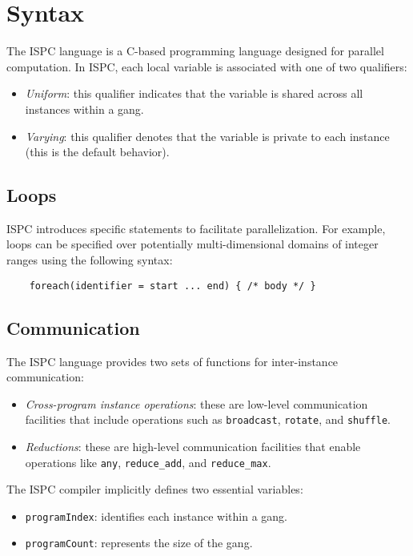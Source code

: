 \section{Syntax}

The ISPC  language is a C-based programming language designed for parallel computation. 
In ISPC, each local variable is associated with one of two qualifiers:
\begin{itemize}
    \item \textit{Uniform}: this qualifier indicates that the variable is shared across all instances within a gang.
    \item \textit{Varying}: this qualifier denotes that the variable is private to each instance (this is the default behavior).
\end{itemize}

\subsection{Loops}
ISPC introduces specific statements to facilitate parallelization. 
For example, loops can be specified over potentially multi-dimensional domains of integer ranges using the following syntax:
\begin{verbatim}
    foreach(identifier = start ... end) { /* body */ }
\end{verbatim}

\subsection{Communication}
The ISPC language provides two sets of functions for inter-instance communication:
\begin{itemize}
    \item \textit{Cross-program instance operations}: these are low-level communication facilities that include operations such as \texttt{broadcast}, \texttt{rotate}, and \texttt{shuffle}.
    \item \textit{Reductions}: these are high-level communication facilities that enable operations like \texttt{any}, \texttt{reduce\_add}, and \texttt{reduce\_max}. 
\end{itemize}

The ISPC compiler implicitly defines two essential variables:
\begin{itemize}
    \item \texttt{programIndex}: identifies each instance within a gang.
    \item \texttt{programCount}: represents the size of the gang.
\end{itemize}

